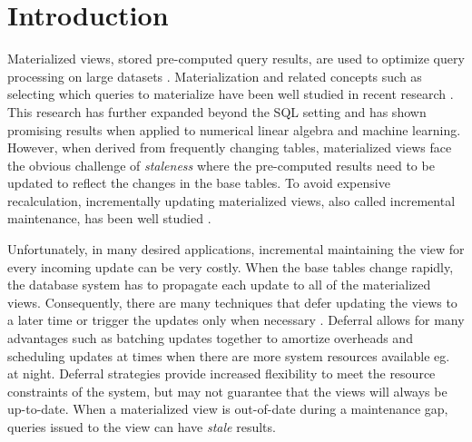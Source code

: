 \section{Introduction}
Materialized views, stored pre-computed query results, are used to optimize query processing on large datasets \cite{gupta1995maintenance, chirkova2011materialized, halevy2001answering}.
Materialization and related concepts such as selecting which queries to materialize
have been well studied in recent research \cite{zaharia2012resilient,lefevre2014opportunistic, bailis2014scalable, perez2014history}.
This research has further expanded beyond the SQL setting \cite{nikolic2014linview} and 
has shown promising results when applied to numerical linear algebra and machine learning.
However, when derived from frequently changing tables,
materialized views face the obvious challenge of \emph{staleness} where the pre-computed results need to be updated to reflect the changes in the base tables.
To avoid expensive recalculation, incrementally updating materialized views,
also called incremental maintenance, has been well studied \cite{gupta1995maintenance, chirkova2011materialized}.

Unfortunately, in many desired applications, incremental maintaining the view for every incoming update can be very costly. 
When the base tables change rapidly, the database system has to propagate each update to all of the materialized views.
Consequently, there are many techniques that defer updating the views to a later time or trigger the updates only when necessary \cite{chirkova2011materialized, zhou2007lazy}.
Deferral allows for many advantages such as batching updates together to amortize overheads and scheduling updates at times when there are more system resources available eg. at night.
Deferral strategies provide increased flexibility to meet the resource constraints of the system, but may not guarantee that the views will always be up-to-date.
When a materialized view is out-of-date during a maintenance gap, queries issued to the view can have \emph{stale} results. 

